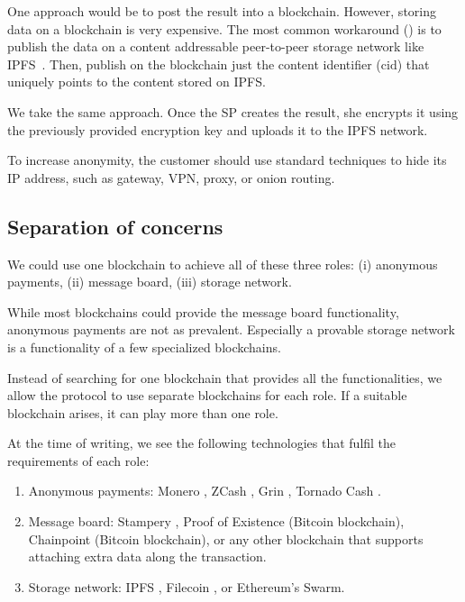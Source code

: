 \documentclass{ieeeaccess}
\begin{document}
One approach would be to post the result into a blockchain. However, storing data on a blockchain is very expensive. The most common workaround (\cite{shahidBlockchainBasedAgriFoodSupply2020, wangAuditableProtocolsFair2019, chenImprovedP2PFile2017}) is to publish the data on a content addressable peer-to-peer storage network like IPFS~\cite{benetIPFSContentAddressed2014}. Then, publish on the blockchain just the content identifier ($\mathrm{cid}$) that uniquely points to the content stored on IPFS.

We take the same approach. Once the SP creates the result, she encrypts it using the previously provided encryption key and uploads it to the IPFS network.

To increase anonymity, the customer should use standard techniques to hide its IP address, such as gateway, VPN, proxy, or onion routing.

\subsection{Separation of concerns}
We could use one blockchain to achieve all of these three roles: (i) anonymous payments, (ii) message board, (iii) storage network.

While most blockchains could provide the message board functionality, anonymous payments are not as prevalent. Especially a provable storage network is a functionality of a few specialized blockchains.

Instead of searching for one blockchain that provides all the functionalities, we allow the protocol to use separate blockchains for each role. If a suitable blockchain arises, it can play more than one role.

At the time of writing, we see the following technologies that fulfil the requirements of each role:

\begin{enumerate}
\def\labelenumi{\arabic{enumi}.}

\item Anonymous payments: Monero \cite{vansaberhagenCryptoNote2013}, ZCash
  \cite{ben-sassonZerocashDecentralizedAnonymous2014}, Grin \cite{fuchsbauerAggregateCashSystems2019},
  Tornado Cash \cite{pertsevTornadoCashPrivacy2019}.
\item Message board: Stampery \cite{crespoStamperyBlockchainTimestamping2017}, Proof of Existence
  \cite{ProofExistenceOnline} (Bitcoin blockchain), Chainpoint
  \cite{ChainpointBlockchainProof} (Bitcoin blockchain), or any other blockchain that
  supports attaching extra data along the transaction.
\item Storage network: IPFS \cite{benetIPFSContentAddressed2014}, Filecoin
  \cite{protocollabsFilecoinDecentralizedStorage2017}, or Ethereum's
  Swarm\cite{teamSWARMStorageCommunication2021}.
\end{enumerate}
\end{document}
